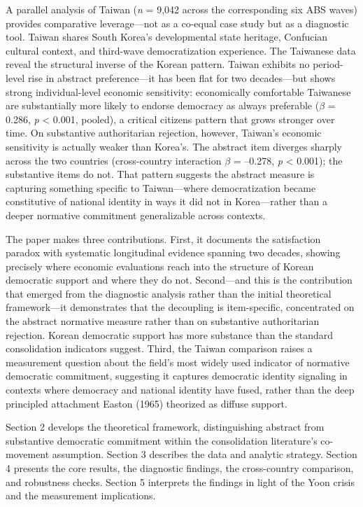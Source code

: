 \documentclass[
  12pt,
  12pt,
  letterpaper]{article}
\begin{document}
A parallel analysis of Taiwan (\emph{n} = 9,042 across the corresponding
six ABS waves) provides comparative leverage---not as a co-equal case
study but as a diagnostic tool. Taiwan shares South Korea's
developmental state heritage, Confucian cultural context, and third-wave
democratization experience. The Taiwanese data reveal the structural
inverse of the Korean pattern. Taiwan exhibits no period-level rise in
abstract preference---it has been flat for two decades---but shows
strong individual-level economic sensitivity: economically comfortable
Taiwanese are substantially more likely to endorse democracy as always
preferable (\(\beta\) = 0.286, \emph{p} \textless{} 0.001, pooled), a
critical citizens pattern that grows stronger over time. On substantive
authoritarian rejection, however, Taiwan's economic sensitivity is
actually weaker than Korea's. The abstract item diverges sharply across
the two countries (cross-country interaction \(\beta\) = --0.278,
\emph{p} \textless{} 0.001); the substantive items do not. That pattern
suggests the abstract measure is capturing something specific to
Taiwan---where democratization became constitutive of national identity
in ways it did not in Korea---rather than a deeper normative commitment
generalizable across contexts.

The paper makes three contributions. First, it documents the
satisfaction paradox with systematic longitudinal evidence spanning two
decades, showing precisely where economic evaluations reach into the
structure of Korean democratic support and where they do not.
Second---and this is the contribution that emerged from the diagnostic
analysis rather than the initial theoretical framework---it demonstrates
that the decoupling is item-specific, concentrated on the abstract
normative measure rather than on substantive authoritarian rejection.
Korean democratic support has more substance than the standard
consolidation indicators suggest. Third, the Taiwan comparison raises a
measurement question about the field's most widely used indicator of
normative democratic commitment, suggesting it captures democratic
identity signaling in contexts where democracy and national identity
have fused, rather than the deep principled attachment Easton (1965)
theorized as diffuse support.

Section 2 develops the theoretical framework, distinguishing abstract
from substantive democratic commitment within the consolidation
literature's co-movement assumption. Section 3 describes the data and
analytic strategy. Section 4 presents the core results, the diagnostic
findings, the cross-country comparison, and robustness checks. Section 5
interprets the findings in light of the Yoon crisis and the measurement
implications.
\end{document}
